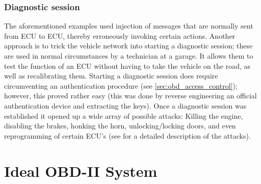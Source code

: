 \subsubsection{Diagnostic session} 
\label{subsubsec:diagnostic_session}

The aforementioned examples used injection of messages that are normally sent from ECU to ECU, thereby erroneously invoking certain actions. Another approach is to trick the vehicle network into starting a diagnostic session; these are used in normal circumstances by a technician at a garage. It allows them to test the function of an ECU without having to take the vehicle on the road, as well as recalibrating them. Starting a diagnostic session does require circumventing an authentication procedure (see \ref{sec:obd_access_control}); however, this proved rather easy (this was done by reverse engineering an official authentication device and extracting the keys). Once a diagnostic session was established it opened up a wide array of possible attacks: Killing the engine, disabling the brakes, honking the horn, unlocking/locking doors, and even reprogramming of certain ECU's (see \cite{MillerC} for a detailed description of the attacks).

\section{Ideal OBD-II System}
\label{sec:sol_RBAC}

